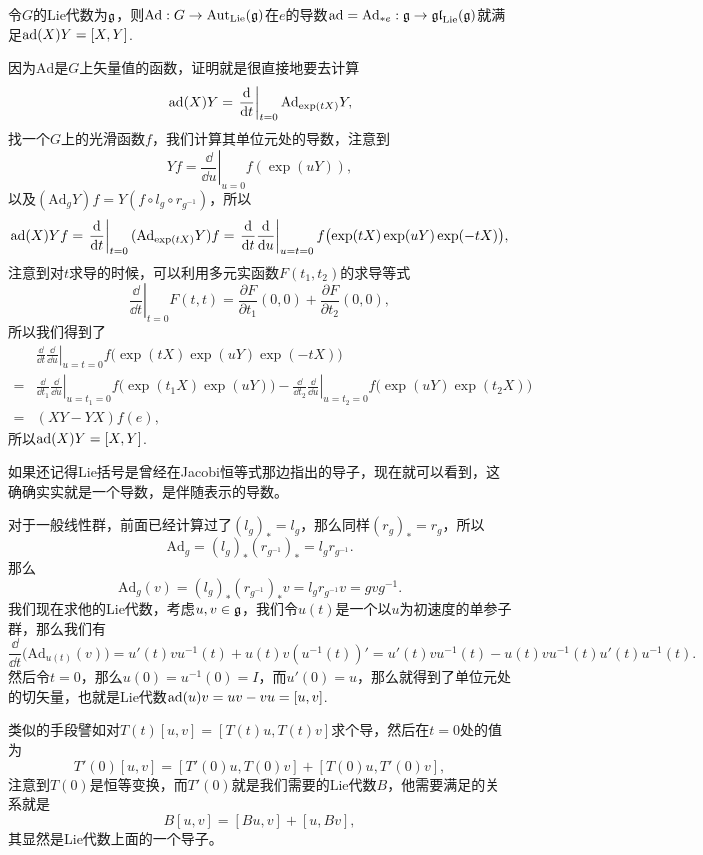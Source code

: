 
\para 令$G$的Lie代数为${\mathfrak{g}}$，则$\mathrm{Ad}:G\to \mathrm{Aut}_{\mathrm{Lie}}({\mathfrak{g}})$在$e$的导数$\operatorname{ad}=\mathrm{Ad}_{*e}:{\mathfrak{g}}\to \mathfrak{gl}_{\mathrm{Lie}}({\mathfrak{g}})$就满足$\operatorname{ad}(X)Y=[X,Y]$.

因为$\mathrm{Ad}$是$G$上矢量值的函数，证明就是很直接地要去计算
\[
	\operatorname{ad}(X)Y=\left.\frac{\mathrm{d}}{\mathrm{d} t}\right|_{t=0}\mathrm{Ad}_{\exp(tX)}Y,
\]
找一个$G$上的光滑函数$f$，我们计算其单位元处的导数，注意到
\[
	Yf=\left.\frac{\dd}{\dd u}\right|_{u=0}f(\exp(uY)),
\]
以及$(\mathrm{Ad}_{g}Y)f=Y(f\circ l_g\circ r_{g^{-1}})$，所以
\[
	\operatorname{ad}(X)Yf=\left.\frac{\mathrm{d}}{\mathrm{d} t}\right|_{t=0}(\mathrm{Ad}_{\exp(tX)}Y)f=\left.\frac{\mathrm{d}}{\mathrm{d} t}\frac{\mathrm{d}}{\mathrm{d} u}\right|_{u=t=0}f\bigl(\exp(tX)\exp(uY)\exp(-tX)\bigr),
\]
注意到对$t$求导的时候，可以利用多元实函数$F(t_1,t_2)$的求导等式
\[
	\left.\frac{\dd}{\dd t}\right|_{t=0}F(t,t)=\frac{\partial F}{\partial t_1}(0,0)+\frac{\partial F}{\partial t_2}(0,0),
\]
所以我们得到了
\[
\begin{split}
	&\left.\frac{\dd}{\dd t}\frac{\dd}{\dd u}\right|_{u=t=0}f\bigl(\exp(tX)\exp(uY)\exp(-tX)\bigr)\\
	=&\left.\frac{\dd}{\dd t_1}\frac{\dd}{\dd u}\right|_{u=t_1=0}f\bigl(\exp(t_1X)\exp(uY)\bigr)-\left.\frac{\dd}{\dd t_2}\frac{\dd}{\dd u}\right|_{u=t_2=0}f\bigl(\exp(uY)\exp(t_2X)\bigr)\\
	=&(XY-YX)f(e),
\end{split}
\]
所以$\operatorname{ad}(X)Y=[X,Y]$.

如果还记得Lie括号是曾经在Jacobi恒等式那边指出的导子，现在就可以看到，这确确实实就是一个导数，是伴随表示的导数。

\para 对于一般线性群，前面已经计算过了$(l_g)_*=l_g$，那么同样$(r_g)_*=r_g$，所以
\[
	\mathrm{Ad}_g=(l_g)_*(r_{g^{-1}})_*=l_gr_{g^{-1}}.
\]
那么
\[
	\mathrm{Ad}_g(v)=(l_g)_*(r_{g^{-1}})_*v=l_gr_{g^{-1}}v=gvg^{-1}.
\]
我们现在求他的Lie代数，考虑$u,v\in {\mathfrak{g}}$，我们令$u(t)$是一个以$u$为初速度的单参子群，那么我们有
\[
	\frac{\dd}{\dd t}\bigl(\mathrm{Ad}_{u(t)}(v)\bigr)=u'(t)vu^{-1}(t)+u(t)v(u^{-1}(t))'=u'(t)vu^{-1}(t)-u(t)vu^{-1}(t)u'(t)u^{-1}(t).
\]
然后令$t=0$，那么$u(0)=u^{-1}(0)=I$，而$u'(0)=u$，那么就得到了单位元处的切矢量，也就是Lie代数$\operatorname{ad}(u)v=uv-vu=[u,v]$.

类似的手段譬如对$T(t)[u,v]=[T(t)u,T(t)v]$求个导，然后在$t=0$处的值为
\[
	T'(0)[u,v]=[T'(0)u,T(0)v]+[T(0)u,T'(0)v],
\]
注意到$T(0)$是恒等变换，而$T'(0)$就是我们需要的Lie代数$B$，他需要满足的关系就是
\[
	B[u,v]=[Bu,v]+[u,Bv],
\]
其显然是Lie代数上面的一个导子。

